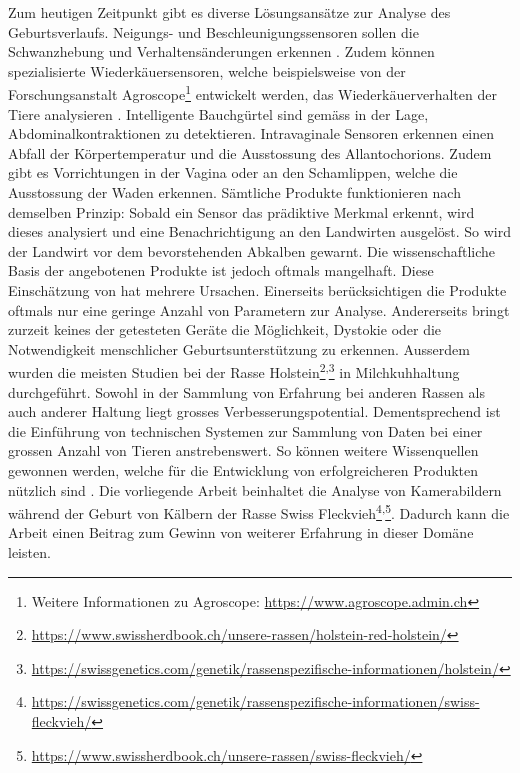 Zum heutigen Zeitpunkt gibt es diverse Lösungsansätze zur Analyse des Geburtsverlaufs. Neigungs- und Beschleunigungssensoren sollen die Schwanzhebung und Verhaltensänderungen erkennen \citep[S. 6]{Saint-Dizier2015}. Zudem können spezialisierte Wiederkäuersensoren, welche beispielsweise von der Forschungsanstalt Agroscope\footnote{Weitere Informationen zu Agroscope: \url{https://www.agroscope.admin.ch}} entwickelt werden, das Wiederkäuerverhalten der Tiere analysieren \citep[S. 2]{Pahl2014}. Intelligente Bauchgürtel sind gemäss \citep[S. 6]{Saint-Dizier2015} in der Lage, \gls{Abdominal}kontraktionen zu detektieren. Intravaginale Sensoren erkennen einen Abfall der Körpertemperatur und die Ausstossung des \gls{Allantochorions}. Zudem gibt es Vorrichtungen in der Vagina oder an den Schamlippen, welche die Ausstossung der Waden erkennen. Sämtliche Produkte funktionieren nach demselben Prinzip: Sobald ein Sensor das prädiktive Merkmal erkennt, wird dieses analysiert und eine Benachrichtigung an den Landwirten ausgelöst. So wird der Landwirt vor dem bevorstehenden Abkalben gewarnt. Die wissenschaftliche  Basis der angebotenen Produkte ist  jedoch oftmals mangelhaft. Diese Einschätzung von \citep[S. 6]{Saint-Dizier2015} hat mehrere Ursachen. Einerseits berücksichtigen die Produkte oftmals nur eine geringe Anzahl von Parametern zur Analyse. Andererseits bringt zurzeit keines der getesteten Geräte die Möglichkeit, Dystokie oder die Notwendigkeit menschlicher Geburtsunterstützung zu erkennen. Ausserdem wurden die meisten Studien bei der Rasse Holstein\footnote{ \url{https://www.swissherdbook.ch/unsere-rassen/holstein-red-holstein/}}\textsuperscript{,}\footnote{\url{https://swissgenetics.com/genetik/rassenspezifische-informationen/holstein/}} in Milchkuhhaltung durchgeführt. Sowohl in der Sammlung von Erfahrung bei anderen Rassen als auch anderer Haltung liegt grosses Verbesserungspotential. Dementsprechend ist die Einführung von technischen Systemen zur Sammlung von Daten bei einer grossen Anzahl von Tieren anstrebenswert. So können weitere Wissenquellen gewonnen werden, welche für die Entwicklung von erfolgreicheren Produkten nützlich sind \citep[S. 6]{Saint-Dizier2015}. Die vorliegende Arbeit beinhaltet die Analyse von Kamerabildern während der Geburt von Kälbern der Rasse Swiss Fleckvieh\footnote{\url{https://swissgenetics.com/genetik/rassenspezifische-informationen/swiss-fleckvieh/}}\textsuperscript{,}\footnote{\url{https://www.swissherdbook.ch/unsere-rassen/swiss-fleckvieh/}}. Dadurch kann die Arbeit einen Beitrag zum Gewinn von weiterer Erfahrung in dieser Domäne leisten.

